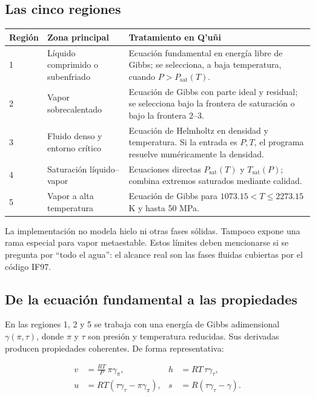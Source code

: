 \documentclass[11pt,a4paper,oneside]{article}
\newcommand{\app}{Q'u\~ni}
\begin{document}
\subsection{Las cinco regiones}

\begin{longtable}{p{1.45cm}p{4.1cm}p{8.3cm}}
\toprule
Regi\'on & Zona principal & Tratamiento en \app{} \\
\midrule
\endhead
1 & L\'iquido comprimido o subenfriado & Ecuaci\'on fundamental en energ\'ia libre de Gibbs; se selecciona, a baja temperatura, cuando $P>P_{\mathrm{sat}}(T)$. \\
2 & Vapor sobrecalentado & Ecuaci\'on de Gibbs con parte ideal y residual; se selecciona bajo la frontera de saturaci\'on o bajo la frontera 2--3. \\
3 & Fluido denso y entorno cr\'itico & Ecuaci\'on de Helmholtz en densidad y temperatura. Si la entrada es $P,T$, el programa resuelve num\'ericamente la densidad. \\
4 & Saturaci\'on l\'iquido--vapor & Ecuaciones directas $P_{\mathrm{sat}}(T)$ y $T_{\mathrm{sat}}(P)$; combina extremos saturados mediante calidad. \\
5 & Vapor a alta temperatura & Ecuaci\'on de Gibbs para $1073.15<T\le2273.15$ K y hasta 50 MPa. \\
\bottomrule
\end{longtable}

La implementaci\'on no modela hielo ni otras fases s\'olidas. Tampoco expone una rama especial para vapor metaestable. Estos l\'imites deben mencionarse si se pregunta por ``todo el agua'': el alcance real son las fases fluidas cubiertas por el c\'odigo IF97.

\subsection{De la ecuaci\'on fundamental a las propiedades}

En las regiones 1, 2 y 5 se trabaja con una energ\'ia de Gibbs adimensional $\gamma(\pi,\tau)$, donde $\pi$ y $\tau$ son presi\'on y temperatura reducidas. Sus derivadas producen propiedades coherentes. De forma representativa:

\begin{align}
v &= \frac{RT}{P}\,\pi\gamma_{\pi}, &
h &= RT\,\tau\gamma_{\tau}, \\
u &= RT\left(\tau\gamma_{\tau}-\pi\gamma_{\pi}\right), &
s &= R\left(\tau\gamma_{\tau}-\gamma\right).
\end{align}
\end{document}
